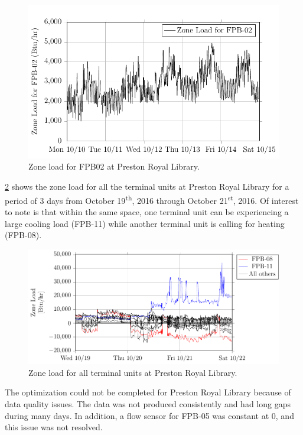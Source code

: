 \begin{figure}
\centering
\includegraphics[]{Plots/2017-04-03-1250-ZoneLoadforFPB02-TikzData.pdf}
\caption{Zone load for FPB02 at Preston Royal Library.}
\label{fig:2017-04-03-1250-ZoneLoadforFPB02-TikzData}
\end{figure}


\figref{} \ref{fig:2017-06-05-0822-ZoneLoadforFPB02-TikzData} shows the
zone load for all the terminal units at Preston Royal Library for a
period of 3 days from October 19\textsuperscript{th}, 2016 through
October 21\textsuperscript{st}, 2016. Of interest to note is that within
the same space, one terminal unit can be experiencing a large cooling
load (FPB-11) while another terminal unit is calling for heating
(FPB-08). 


\begin{figure}
\centering
\includegraphics[]{Plots/2017-06-05-0822-ZoneLoadforFPB02-TikzData.pdf}
\caption{Zone load for all terminal units at Preston Royal Library.}
\label{fig:2017-06-05-0822-ZoneLoadforFPB02-TikzData}
\end{figure}

The optimization could not be completed for Preston Royal Library
because of data quality issues. The data was not produced consistently
and had long gaps during many days. In addition, a flow sensor for
FPB-05 was constant at 0, and this issue was not resolved. 


